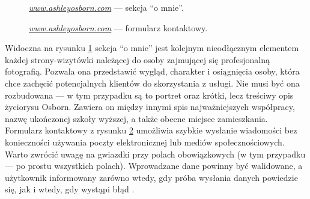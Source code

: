 \documentclass[12pt]{article}
\numberwithin{figure}{section}
\begin{document}
\begin{sloppypar}
\begin{figure}[H] 
    \centering
   \caption{\textit{\url{www.ashleyosborn.com}} --- sekcja ``o mnie''.}
   \label{fig:ashley-2.jpg}
\end{figure}

\begin{figure}[H] 
    \centering
   \caption{\textit{\url{www.ashleyosborn.com}} --- formularz kontaktowy.}
   \label{fig:ashley-3.jpg}
\end{figure}

\newpage

Widoczna na rysunku \ref{fig:ashley-2.jpg} sekcja ``o mnie'' jest kolejnym nieodłącznym elementem każdej strony-wizytówki należącej do osoby zajmującej się profesjonalną fotografią. Pozwala ona przedstawić wygląd, charakter i osiągnięcia osoby, która chce zachęcić potencjalnych klientów do skorzystania z usługi. Nie musi być ona rozbudowana --- w tym przypadku są to portret oraz krótki, lecz treściwy opis życiorysu Osborn. Zawiera on między innymi spis najważniejszych współpracy, nazwę ukończonej szkoły wyższej, a także obecne miejsce zamieszkania. Formularz kontaktowy z rysunku \ref{fig:ashley-3.jpg} umożliwia szybkie wysłanie wiadomości bez konieczności używania poczty elektronicznej lub mediów społecznościowych. Warto zwrócić uwagę na gwiazdki przy polach obowiązkowych (w tym przypadku --- po prostu wszystkich polach). Wprowadzane dane powinny być walidowane, a użytkownik informowany zarówno wtedy, gdy próba wysłania danych powiedzie się, jak i wtedy, gdy wystąpi błąd \cite{formularze}.


\end{sloppypar}
\end{document}
